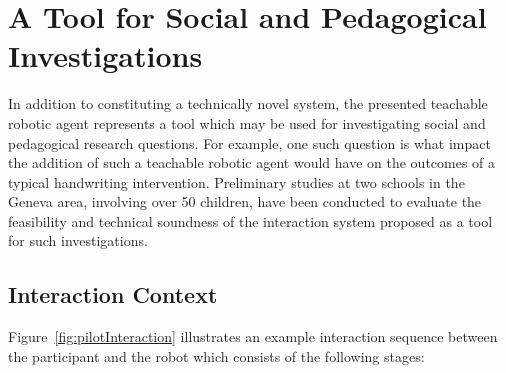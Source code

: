 \documentclass{sig-alternate}
\begin{document}


\section{A Tool for Social and Pedagogical Investigations} \label{sec:experiment}
\label{sec4}

In addition to constituting a technically novel system, the presented teachable
robotic agent represents a tool which may be used for investigating social and
pedagogical research questions. For example, one such question is what impact the addition of
such a teachable robotic agent would have on the outcomes of a typical
handwriting intervention. 
Preliminary studies at two schools in the Geneva area, involving over 50 children, 
have been conducted to evaluate the feasibility and technical soundness of the 
interaction system proposed as a tool for such investigations.

\subsection{Interaction Context}

Figure~\ref{fig:pilotInteraction}
illustrates an example interaction sequence between the participant and the
robot which consists of the following stages:
\end{document}
